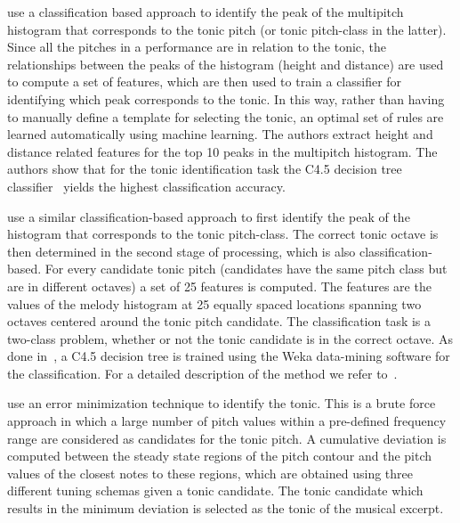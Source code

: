 \cite{salamon2012multipitch} use a classification based approach to identify the peak of the multipitch histogram that corresponds to the tonic pitch (or tonic pitch-class in the latter). Since all the pitches in a performance are in relation to the tonic, the relationships between the peaks of the histogram (height and distance) are used to compute a set of features, which are then used to train a classifier for identifying which peak corresponds to the tonic. In this way, rather than having to manually define a template for selecting the tonic, an optimal set of rules are learned automatically using machine learning. The authors extract height and distance related features for the top 10 peaks in the multipitch histogram. The authors show that for the tonic identification task the C4.5 decision tree classifier~\citep{Quinlan:1993:CPM:152181} yields the highest classification accuracy. 

\cite{gulati2012two} use a similar classification-based approach to first identify the peak of the histogram that corresponds to the tonic pitch-class. The correct tonic octave is then determined in the second stage of processing, which is also classification-based. For every candidate tonic pitch (candidates have the same pitch class but are in different octaves) a set of 25 features is computed. The features are the values of the melody histogram at 25 equally spaced locations spanning two octaves centered around the tonic pitch candidate. The classification task is a two-class problem, whether or not the tonic candidate is in the correct octave. As done in~\cite{salamon2012multipitch}, a C4.5 decision tree is trained using the Weka data-mining software for the classification. For a detailed description of the method we refer to~\cite{SGulati_MThesis2012}.

\cite{Sengupta2005b} use an error minimization technique to identify the tonic. This is a brute force approach in which a large number of pitch values within a pre-defined frequency range are considered as candidates for the tonic pitch. A cumulative deviation is computed between the steady state regions of the pitch contour and the pitch values of the closest notes to these regions, which are obtained using three different tuning schemas given a tonic candidate. The tonic candidate which results in the minimum deviation is selected as the tonic of the musical excerpt.

